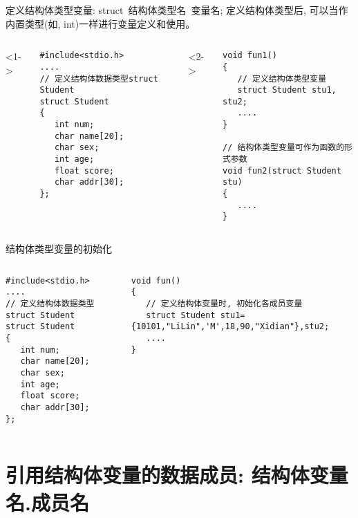 \begin{frame}{定义结构体类型变量: struct\, 结构体类型名\, 变量名;}
定义结构体类型后, 可以当作内置类型(如, int)一样进行变量定义和使用。
\vspace{-0.2cm}
\begin{columns}[T]
<1->
\begin{lstlisting}
#include<stdio.h>
....
// 定义结构体数据类型struct Student
struct Student 
{
   int num;
   char name[20]; 
   char sex; 
   int age; 
   float score; 
   char addr[30]; 
};         
\end{lstlisting}
<2->
\begin{lstlisting}[frame=leftline]
void fun1()
{
   // 定义结构体类型变量
   struct Student stu1, stu2; 
   .... 
}

// 结构体类型变量可作为函数的形式参数
void fun2(struct Student stu)
{
   ....
}
\end{lstlisting}
\end{columns}
\end{frame}

\begin{frame}{结构体类型变量的初始化}
\begin{columns}[T]
\begin{lstlisting}
#include<stdio.h>
....
// 定义结构体数据类型struct Student
struct Student 
{
   int num;
   char name[20]; 
   char sex; 
   int age; 
   float score; 
   char addr[30]; 
};         
\end{lstlisting}
\begin{lstlisting}[frame=leftline]
void fun()
{
   // 定义结构体变量时, 初始化各成员变量
   struct Student stu1={10101,"LiLin",'M',18,90,"Xidian"},stu2; 
   .... 
}
\end{lstlisting}
\end{columns}
\end{frame}

\section{引用结构体变量的数据成员: 结构体变量名.成员名}

